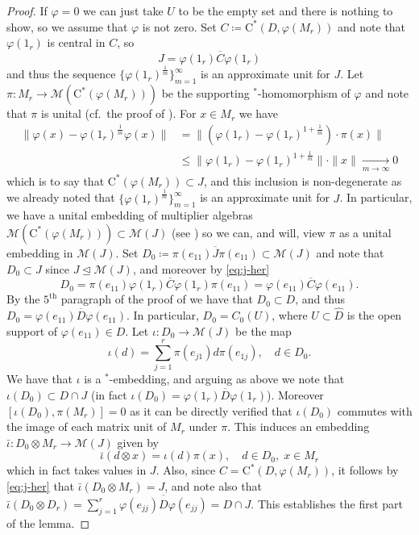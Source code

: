 \documentclass[11pt,a4paper]{amsart}
\theoremstyle{definition}
\numberwithin{equation}{section}
\newcommand{\mc}[1]{\mathcal{#1}}
\begin{document}
\begin{proof}
If $\varphi=0$ we can just take $U$ to be the empty set and there is nothing to show, so we assume that $\varphi$ is not zero. Set $C\coloneqq \mathrm{C}^\ast(D,\varphi(M_r))$ and note that $\varphi(1_r)$ is central in $C$, so 
\begin{equation}\label{eq:j-her}
J = \overline{\varphi(1_r)C\varphi(1_r)}
\end{equation}
and thus the sequence $\{\varphi(1_r)^\frac{1}{m}\}_{m=1}^\infty$ is an approximate unit for $J$. Let $\pi\colon M_r\to \mathcal{M}(\mathrm{C}^\ast(\varphi(M_r)))$ be the supporting $^*$-homomorphism of $\varphi$ and note that $\pi$ is unital (cf.\ the proof of \cite[Theorem~2.3]{WinZac09}). For $x\in M_r$ we have
\begin{align*}
\|\varphi(x)-\varphi(1_r)^\frac{1}{m}\varphi(x)\|&=\|(\varphi(1_r)-\varphi(1_r)^{1+\frac{1}{m}})\cdot\pi(x)\|\\
&\le \|\varphi(1_r)-\varphi(1_r)^{1+\frac{1}{m}}\| \cdot\|x\|\xrightarrow[m\to\infty]{}0
\end{align*}
which is to say that $\mathrm{C}^\ast(\varphi(M_r))\subset J$, and this inclusion is non-degenerate as we already noted that $\{\varphi(1_r)^\frac{1}{m}\}_{m=1}^\infty$ is an approximate unit for $J$. In particular, we have a unital embedding of multiplier algebras $\mc{M}(\mathrm{C}^\ast(\varphi(M_r)))\subset\mc{M}(J)$ (see \cite[Chapter 2]{Lance95}) so we can, and will, view $\pi$ as a unital embedding in $\mc{M}(J)$. Set $D_0\coloneqq \overline{\pi(e_{11})J\pi(e_{11})}\subset\mathcal{M}(J)$ and note that $D_0\subset J$ since $J\trianglelefteq\mc{M}(J)$, and moreover by \eqref{eq:j-her}
\[
D_0=\overline{\pi(e_{11})\varphi(1_r)C\varphi(1_r)\pi(e_{11})}=\overline{\varphi(e_{11})C\varphi(e_{11})}.
\]
By the $5^{\mathrm{th}}$ paragraph of the proof of \cite[Proposition~4.3]{KopWin24} we have that $D_0\subset D$, and thus $D_0=\overline{\varphi(e_{11})D\varphi(e_{11})}$. In particular, $D_0= C_0(U)$, where $U\subset\widehat{D}$ is the open support of $\varphi(e_{11})\in D$. Let $\iota\colon D_0\to \mathcal{M}(J)$ be the map
\begin{equation}\label{eq:subhomlemma-iota}
\iota(d) = \sum_{j=1}^r\pi(e_{j1})d\pi(e_{1j}),\quad d\in D_0.
\end{equation}
We have that $\iota$ is a $^\ast$-embedding, and arguing as above we note that $\iota(D_0)\subset D\cap J$ (in fact $\iota(D_0)=\overline{\varphi(1_r)D\varphi(1_r)}$). Moreover $[\iota(D_0),\pi(M_r)]=0$ as it can be directly verified that $\iota(D_0)$ commutes with the image of each matrix unit of $M_r$  under $\pi$. This induces an embedding $\bar\iota\colon D_0\otimes M_r \to\mc{M}(J)$ given by
\begin{equation}
\bar\iota(d\otimes x) = \iota(d)\pi(x),\quad d\in D_0,\; x\in M_r
\end{equation}
which in fact takes values in $J$. Also, since $C=\mathrm{C}^\ast(D,\varphi(M_r))$, it follows by \eqref{eq:j-her} that $\bar\iota(D_0\otimes M_r)=J$, and note also that $\bar\iota(D_0\otimes D_r) =\sum_{j=1}^r\overline{\varphi(e_{jj})D\varphi(e_{jj})} = D\cap J$. This establishes the first part of the lemma.


\end{proof}
\end{document}
